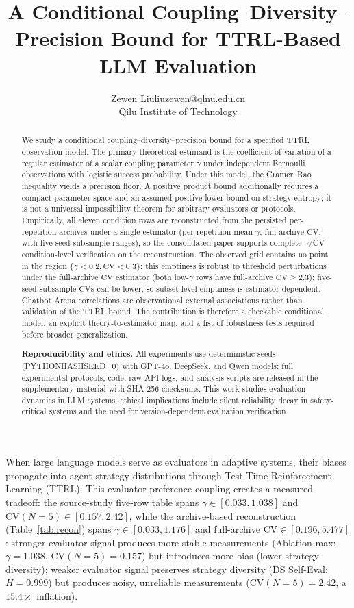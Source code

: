 \documentclass[11pt]{article}
\author{\name Zewen Liu\email liuzewen@qlnu.edu.cn\\\addr Qilu Institute of Technology}  %
\title{A Conditional Coupling--Diversity--Precision Bound for TTRL-Based LLM Evaluation}
\begin{document}
\maketitle
\begin{abstract}
We study a conditional coupling--diversity--precision bound for a specified TTRL observation model. The primary theoretical estimand is the coefficient of variation of a regular estimator of a scalar coupling parameter $\gamma$ under independent Bernoulli observations with logistic success probability. Under this model, the Cramer--Rao inequality yields a precision floor. A positive product bound additionally requires a compact parameter space and an assumed positive lower bound on strategy entropy; it is not a universal impossibility theorem for arbitrary evaluators or protocols. Empirically, all eleven condition rows are reconstructed from the persisted per-repetition archives under a single estimator (per-repetition mean $\gamma$; full-archive $\mathrm{CV}$, with five-seed subsample ranges), so the consolidated paper supports complete $\gamma$/CV condition-level verification on the reconstruction. The observed grid contains no point in the region $\{\gamma<0.2,\mathrm{CV}<0.3\}$; this emptiness is robust to threshold perturbations under the full-archive $\mathrm{CV}$ estimator (both low-$\gamma$ rows have full-archive $\mathrm{CV} \geq 2.3$); five-seed subsample $\mathrm{CV}$s can be lower, so subset-level emptiness is estimator-dependent. Chatbot Arena correlations are observational external associations rather than validation of the TTRL bound. The contribution is therefore a checkable conditional model, an explicit theory-to-estimator map, and a list of robustness tests required before broader generalization.


\textbf{Reproducibility and ethics.} All experiments use deterministic seeds (PYTHONHASHSEED=0) with GPT-4o, DeepSeek, and Qwen models; full experimental protocols, code, raw API logs, and analysis scripts are released in the supplementary material with SHA-256 checksums. This work studies evaluation dynamics in LLM systems; ethical implications include silent reliability decay in safety-critical systems and the need for version-dependent evaluation verification.\end{abstract}




When large language models serve as evaluators in adaptive systems, their biases propagate into agent strategy distributions through Test-Time Reinforcement Learning (TTRL). This evaluator preference coupling creates a measured tradeoff: the source-study five-row table spans $\gamma \in [0.033, 1.038]$ and $\mathrm{CV}(N{=}5) \in [0.157, 2.42]$, while the archive-based reconstruction (Table~\ref{tab:recon}) spans $\gamma \in [0.033, 1.176]$ and full-archive $\mathrm{CV} \in [0.196, 5.477]$: stronger evaluator signal produces more stable measurements (Ablation max: $\gamma = 1.038$, $\mathrm{CV}(N{=}5) = 0.157$) but introduces more bias (lower strategy diversity); weaker evaluator signal preserves strategy diversity (DS Self-Eval: $H = 0.999$) but produces noisy, unreliable measurements ($\mathrm{CV}(N{=}5) = 2.42$, a $15.4\times$ inflation).
\end{document}
